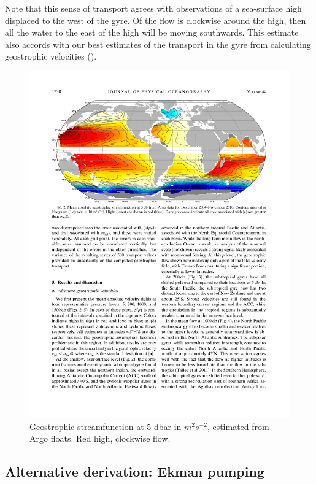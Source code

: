Note that this sense of transport agrees with observations of a sea-surface high displaced to the west of the gyre.  Of the flow is clockwise around the high, then all the water to the east of the high will be moving southwards.  This estimate also accords with our best estimates of the transport in the gyre from calculating geostrophic velocities ().  

\begin{figure}[hbt]
  \begin{center}
    \includegraphics{figs/Sverdrup/GrayRiserFig2}
    \caption{Geostrophic streamfunction at 5 dbar in $m^2s^{-2}$, estimated from Argo floats. Red high, clockwise flow. \citep{grayriser14}}
    \label{fig:GrayRiserFig2}  
  \end{center}
\end{figure}

\subsection{Alternative derivation: Ekman pumping}

